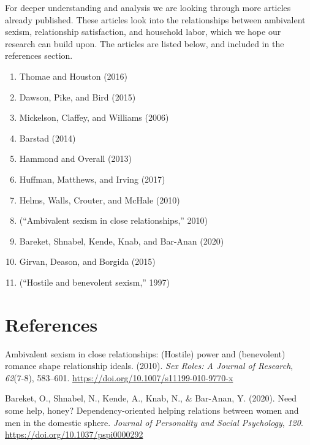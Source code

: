 \documentclass[
  english,
  man]{apa6}
\providecommand{\tightlist}{%
  \setlength{\itemsep}{0pt}\setlength{\parskip}{0pt}}
\begin{document}
For deeper understanding and analysis we are looking through more articles already published. These articles look into the relationships between ambivalent sexism, relationship satisfaction, and household labor, which we hope our research can build upon. The articles are listed below, and included in the references section.

\begin{enumerate}
\def\labelenumi{\arabic{enumi}.}
\tightlist
\item
  Thomae and Houston (2016)
\item
  Dawson, Pike, and Bird (2015)
\item
  Mickelson, Claffey, and Williams (2006)
\item
  Barstad (2014)
\item
  Hammond and Overall (2013)
\item
  Huffman, Matthews, and Irving (2017)
\item
  Helms, Walls, Crouter, and McHale (2010)
\item
  (``Ambivalent sexism in close relationships,'' 2010)
\item
  Bareket, Shnabel, Kende, Knab, and Bar-Anan (2020)
\item
  Girvan, Deason, and Borgida (2015)
\item
  (``Hostile and benevolent sexism,'' 1997)
\end{enumerate}

\newpage

\hypertarget{references}{%
\section{References}\label{references}}

\begingroup
\setlength{\parindent}{-0.5in}
\setlength{\leftskip}{0.5in}

\hypertarget{refs}{}
\leavevmode\hypertarget{ref-0546b000ecf94c278dbbcc10a41db43d}{}%
Ambivalent sexism in close relationships: (Hostile) power and (benevolent) romance shape relationship ideals. (2010). \emph{Sex Roles: A Journal of Research}, \emph{62}(7-8), 583--601. \url{https://doi.org/10.1007/s11199-010-9770-x}

\leavevmode\hypertarget{ref-article3}{}%
Bareket, O., Shnabel, N., Kende, A., Knab, N., \& Bar-Anan, Y. (2020). Need some help, honey? Dependency-oriented helping relations between women and men in the domestic sphere. \emph{Journal of Personality and Social Psychology}, \emph{120}. \url{https://doi.org/10.1037/pspi0000292}
\end{document}
